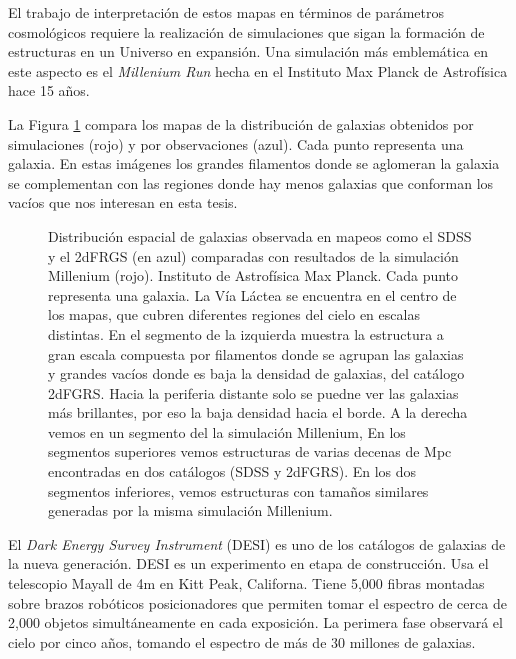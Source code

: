\documentclass[preprint]{aastex62}
\begin{document}
El trabajo de interpretaci\'on de estos mapas en t\'erminos de
par\'ametros cosmol\'ogicos requiere la realizaci\'on de simulaciones
que sigan la formaci\'on de estructuras en un Universo en expansi\'on.
Una simulación m\'as emblem\'atica en este aspecto es el \textit{Millenium Run}
hecha en el Instituto Max Planck de Astrof\'isica hace 15 a\~nos. 

La Figura \ref{fig:pie_millenium_walls} compara los mapas de la
distribuci\'on de galaxias obtenidos por simulaciones (rojo) y por
observaciones (azul).
Cada punto representa una galaxia.
En estas im\'agenes los grandes filamentos donde se aglomeran la
galaxia se complementan con las regiones donde hay menos galaxias que
conforman los vac\'ios que nos interesan en esta tesis.

  \begin{figure}
    \caption{Distribuci\'on espacial de galaxias observada en mapeos como el SDSS y
      el 2dFRGS (en azul) comparadas con resultados de la simulación Millenium (rojo).
      Instituto de Astrofísica Max Planck. Cada punto representa una galaxia.
      La Vía Láctea se encuentra en el centro de los mapas, que cubren diferentes regiones
      del cielo en escalas distintas.
      En el segmento de la izquierda muestra la estructura a gran escala compuesta por
      filamentos donde se agrupan las galaxias y grandes vacíos donde es baja la densidad
      de galaxias, del catálogo 2dFGRS. Hacia la periferia distante solo se puedne ver las
      galaxias más brillantes, por eso la baja densidad hacia el borde.
      A la derecha vemos en un segmento del la simulación Millenium,
     En los
      segmentos superiores vemos estructuras de varias decenas de Mpc encontradas en dos
      catálogos (SDSS y 2dFGRS). En los dos segmentos inferiores, vemos estructuras con
      tamaños similares generadas por la misma simulación Millenium.
      \label{fig:pie_millenium_walls}}
  \end{figure}
  
  El \textit{Dark Energy Survey Instrument} (DESI) es uno de los catálogos de galaxias
  de la nueva generación. DESI es un experimento en etapa
  de construcción. Usa el telescopio Mayall de 4m en Kitt Peak, Californa. Tiene
  5,000 fibras montadas sobre brazos robóticos posicionadores que permiten tomar  el espectro
  de cerca de 2,000 objetos
  simultáneamente en cada exposición. La perimera fase observará el cielo por
  cinco años, tomando el espectro de más de 30 millones de galaxias.
\end{document}
